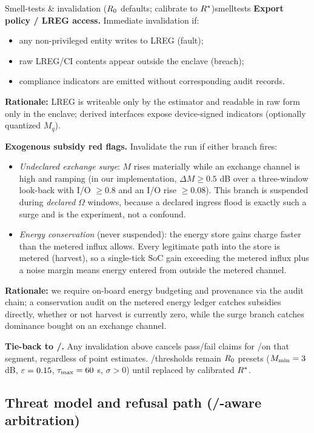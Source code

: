 \documentclass[11pt]{article}
\begin{document}
\begin{docbox}{Smell-tests \& invalidation ($R_0$ defaults; calibrate to $R^*$)}{smelltests}
\textbf{Export policy / LREG access.} Immediate invalidation if:
\begin{itemize}
\item any non-privileged entity writes to LREG (fault);
\item raw LREG/CI contents appear outside the enclave (breach);
\item compliance indicators are emitted without corresponding audit records.
\end{itemize}
\textbf{Rationale:} LREG is writeable only by the estimator and readable in raw form only in the enclave; derived interfaces expose device-signed indicators (optionally quantized $M_q$).

\textbf{Exogenous subsidy red flags.} Invalidate the run if either branch fires:
\begin{itemize}
\item \emph{Undeclared exchange surge}: $M$ rises materially while an exchange channel is high and ramping (in our implementation, $\Delta M \geq 0.5$ dB over a three-window look-back with I/O $\geq 0.8$ and an I/O rise $\geq 0.08$). This branch is suspended during \emph{declared} $\Omega$ windows, because a declared ingress flood is exactly such a surge and is the experiment, not a confound.
\item \emph{Energy conservation} (never suspended): the energy store gains charge faster than the metered influx allows. Every legitimate path into the store is metered (harvest), so a single-tick SoC gain exceeding the metered influx plus a noise margin means energy entered from outside the metered channel.
\end{itemize}
\textbf{Rationale:} we require on-board energy budgeting and provenance via the audit chain; a conservation audit on the metered energy ledger catches subsidies directly, whether or not harvest is currently zero, while the surge branch catches dominance bought on an exchange channel.

\textbf{Tie-back to \NC/\SC.} Any invalidation above cancels pass/fail claims for \NC/\SC on that segment, regardless of point estimates. \NC/\SC thresholds remain $R_0$ presets ($M_{\min} = 3$ dB, $\varepsilon = 0.15$, $\tau_{\max} = 60$ s, $\sigma > 0$) until replaced by calibrated $R^*$.
\end{docbox}

\subsection{Threat model and refusal path (\NC/\SC-aware arbitration)}
\label{sec:threat_model}
\end{document}
